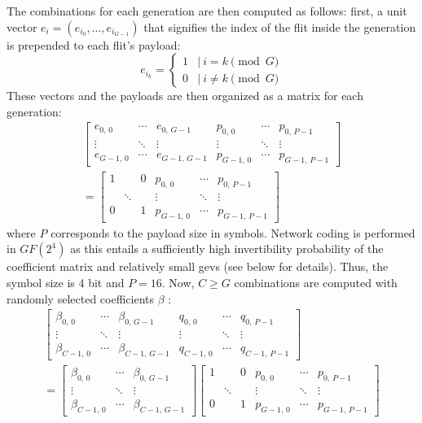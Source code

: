 The combinations for each generation are then computed as follows: first, a unit vector $e_i = (e_{i_0}, …, e_{i_{G-1}})$ that signifies the index of
the flit inside the generation \cite[cf.][3]{chou03practicalnc} is prepended to each flit's payload:
\[
    e_{i_k} =
    \begin{cases}
        1 & |\ i = k \pmod G \\
        0 & |\ i \neq k \pmod G
    \end{cases}
\]
These vectors and the payloads are then organized as a matrix for each generation:
\[
    \begin{split}
        \begin{bmatrix}
            e_{0,\,0} & \cdots & e_{0,\,G-1} & p_{0,\,0} & \cdots & p_{0,\,P-1} \\
            \vdots & \ddots & \vdots & \vdots & \ddots & \vdots \\
            e_{G-1,\,0} & \cdots & e_{G-1,\,G-1} & p_{G-1,\,0} & \cdots & p_{G-1,\,P-1}
        \end{bmatrix}\\
        =
        \begin{bmatrix}
            1 & & 0 & p_{0,\,0} & \cdots & p_{0,\,P-1} \\
            & \ddots & & \vdots & \ddots & \vdots \\
            0 & & 1 & p_{G-1,\,0} & \cdots & p_{G-1,\,P-1}
        \end{bmatrix}
    \end{split}
\]
where $P$ corresponds to the payload size in symbols. Network coding is performed in $GF(2^4)$ as this entails a sufficiently high invertibility
probability of the coefficient matrix and relatively small \glspl{gev} (see below for details). Thus, the symbol size is 4 bit and $P = 16$. Now,
$C \geq G$ combinations are computed with randomly selected coefficients $\beta$ \cite[cf.][]{ho03randomcoding}:
\[
    \begin{split}
        \begin{bmatrix}
            \beta_{0,\,0} & \cdots & \beta_{0,\,G-1} & q_{0,\,0} & \cdots & q_{0,\,P-1} \\
            \vdots & \ddots & \vdots & \vdots & \ddots & \vdots \\
            \beta_{C-1,\,0} & \cdots & \beta_{C-1,\,G-1} & q_{C-1,\,0} & \cdots & q_{C-1,\,P-1}
        \end{bmatrix}\\
        =
        \begin{bmatrix}
            \beta_{0,\,0} & \cdots & \beta_{0,\,G-1}\\
            \vdots & \ddots & \vdots \\
            \beta_{C-1,\,0} & \cdots & \beta_{C-1,\,G-1}
        \end{bmatrix}
        \begin{bmatrix}
            1 & & 0 & p_{0,\,0} & \cdots & p_{0,\,P-1} \\
            & \ddots & & \vdots & \ddots & \vdots \\
            0 & & 1 & p_{G-1,\,0} & \cdots & p_{G-1,\,P-1}
        \end{bmatrix}
    \end{split}
\]

